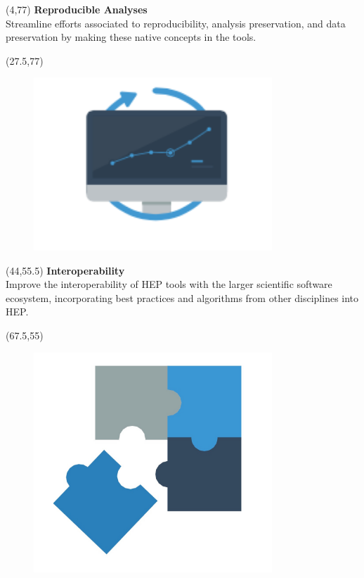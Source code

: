 \documentclass[final]{beamer}
\begin{document}
\begin{frame}{}

\begin{textblock}{22.5}(4,77)
\textcolor{mybluelabel}{\bf Reproducible Analyses} \\
Streamline efforts associated to reproducibility, analysis preservation, and data preservation by making these native concepts in the tools.
\end{textblock}

\begin{textblock}{12.5}(27.5,77)
\begin{figure}[tbph]
\centering
\includegraphics[width=0.8\textwidth]{reproducible-ss.png}
\end{figure}
\end{textblock}


\begin{textblock}{22.5}(44,55.5)
\textcolor{mybluelabel}{\bf Interoperability} \\
Improve the interoperability of HEP tools with the larger scientific software ecosystem, incorporating best practices and algorithms from other disciplines into HEP.
\end{textblock}

\begin{textblock}{12.5}(67.5,55)
\begin{figure}[tbph]
\centering
\includegraphics[width=0.8\textwidth]{interoperable.jpg}
\end{figure}
\end{textblock}


\end{frame}
\end{document}

